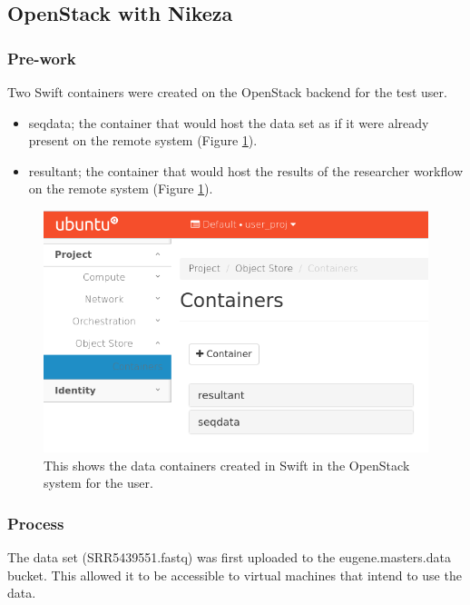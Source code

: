 \subsection{OpenStack with Nikeza}

\subsubsection{Pre-work}

Two Swift containers were created on the OpenStack backend for the test user.

\begin{itemize}
    \item seqdata; the container that would host the data set as if it were already present on the remote system (Figure \ref{fig:swift_prep}).
    \item resultant; the container that would host the results of the researcher workflow on the remote system (Figure \ref{fig:swift_prep}).
\end{itemize}

\begin{figure}[h!]
\centering
\includegraphics[width=\textwidth]{Figures/4_os_swift_prep.png}
\decoRule
\caption[OpenStack Swift Containers for Testing]{This shows the data containers created in Swift in the OpenStack system for the user.}
\label{fig:swift_prep}
\end{figure}

\subsubsection{Process}

The data set (SRR5439551.fastq) was first uploaded to the eugene.masters.data bucket. This allowed it to be accessible to virtual machines that intend to use the data.

